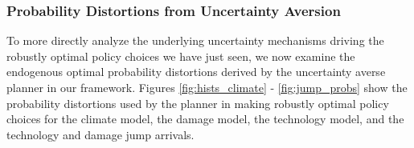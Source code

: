 \documentclass[12pt]{article}
\begin{document}





\subsubsection{Probability Distortions from Uncertainty Aversion}

To more directly analyze the underlying uncertainty mechanisms driving the robustly optimal policy choices we have just seen, we now examine the endogenous optimal probability distortions derived by the uncertainty averse planner in our framework. Figures \ref{fig:hists_climate} - \ref{fig:jump_probs} show the probability distortions used by the planner in making robustly optimal policy choices for the climate model, the damage model, the technology model, and the technology and damage jump arrivals. 

\end{document}
